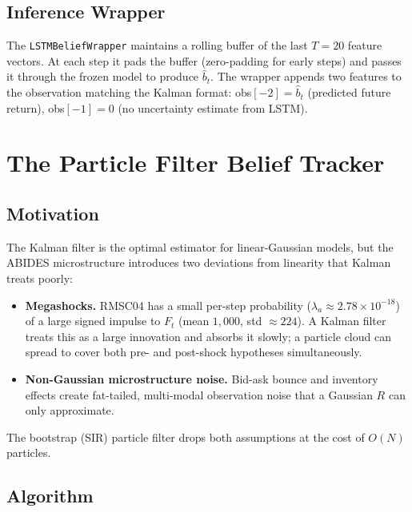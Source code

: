 \documentclass[11pt]{article}
\begin{document}
\subsection{Inference Wrapper}

The \texttt{LSTMBeliefWrapper} maintains a rolling buffer of the last
$T=20$ feature vectors.
At each step it pads the buffer (zero-padding for early steps) and passes it
through the frozen model to produce $\hat{b}_t$.
The wrapper appends two features to the observation matching the Kalman format:
obs$[-2] = \hat{b}_t$ (predicted future return), obs$[-1] = 0$ (no uncertainty
estimate from LSTM).

\section{The Particle Filter Belief Tracker}

\subsection{Motivation}

The Kalman filter is the optimal estimator for linear-Gaussian models, but the
ABIDES microstructure introduces two deviations from linearity that Kalman
treats poorly:
\begin{itemize}[leftmargin=1.5em]
  \item \textbf{Megashocks.} RMSC04 has a small per-step probability
    ($\lambda_a \approx 2.78 \times 10^{-18}$) of a large signed impulse to
    $F_t$ (mean $1{,}000$\textcent, std $\approx 224$\textcent).
    A Kalman filter treats this as a large innovation and absorbs it slowly;
    a particle cloud can spread to cover both pre- and post-shock hypotheses simultaneously.
  \item \textbf{Non-Gaussian microstructure noise.} Bid-ask bounce and
    inventory effects create fat-tailed, multi-modal observation noise that
    a Gaussian $R$ can only approximate.
\end{itemize}
The bootstrap (SIR) particle filter drops both assumptions at the cost of
$O(N)$ particles.

\subsection{Algorithm}
\end{document}
